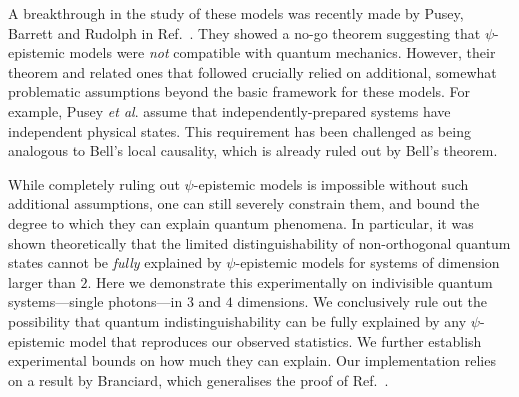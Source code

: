 \documentclass[aps,prl,floatfix,twocolumn,tightenlines,amsmath,amssymb,nofootinbib]{revtex4-1}
\begin{document}
A breakthrough in the study of these models was recently made by Pusey, Barrett and Rudolph in Ref.~\cite{Pusey2012}. They showed a no-go theorem suggesting that $\psi$-epistemic models were \emph{not} compatible with quantum mechanics. However, their theorem and related ones that followed\cite{Colbeck2011,hardy2013are,Patra2013no-,Aaronson2013,Colbeck2013} crucially relied on additional, somewhat problematic assumptions beyond the basic framework for these models.
For example, Pusey \emph{et al}. assume that independently-prepared systems have independent physical states\cite{Pusey2012}. This requirement has been challenged\cite{Emerson2013} as being analogous to Bell's local causality, which is already ruled out by Bell's theorem\cite{Bell1964}.

While completely ruling out $\psi$-epistemic models is impossible without such additional assumptions\cite{Lewis2012,Aaronson2013}, one can still severely constrain them, and bound the degree to which they can explain quantum phenomena. In particular, it was shown theoretically\cite{Barrett2014,Leifer2014,Branciard2014a} that the limited distinguishability of non-orthogonal quantum states cannot be \emph{fully} explained by $\psi$-epistemic models for systems of dimension larger than $2$.
Here we demonstrate this experimentally on indivisible quantum systems---single photons---in $3$ and $4$ dimensions. We conclusively rule out the possibility that quantum indistinguishability can be fully explained by any $\psi$-epistemic model that reproduces our observed statistics. We further establish experimental bounds on how much they can explain.
Our implementation relies on a result by Branciard\cite{Branciard2014a}, which generalises the proof of Ref.~\cite{Barrett2014}.
\end{document}
